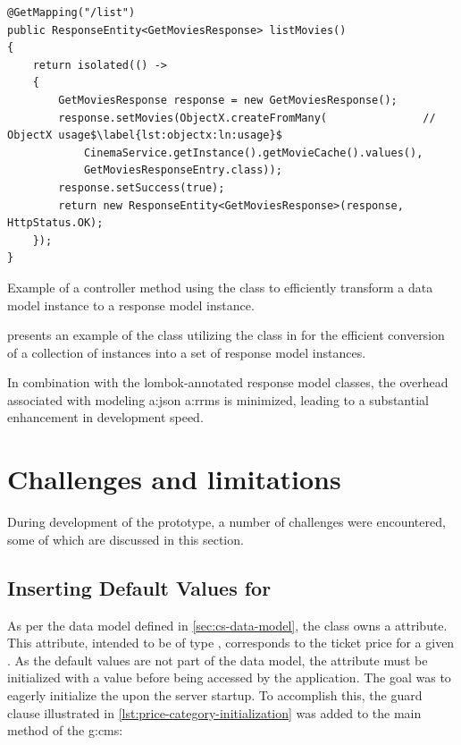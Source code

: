\begin{listing}[H]
\begin{verbatim}
@GetMapping("/list")
public ResponseEntity<GetMoviesResponse> listMovies() 
{
    return isolated(() -> 
    {
        GetMoviesResponse response = new GetMoviesResponse();
        response.setMovies(ObjectX.createFromMany(               // ObjectX usage$\label{lst:objectx:ln:usage}$
            CinemaService.getInstance().getMovieCache().values(), 
            GetMoviesResponseEntry.class));
        response.setSuccess(true);
        return new ResponseEntity<GetMoviesResponse>(response, HttpStatus.OK);
    });
}
\end{verbatim}
\vspace{-.5cm}
\caption{Example of a controller method using the  class to efficiently transform a data model instance to a response model instance.}
\label{lst:reflective-object-mapping-example}
\end{listing}

 presents an example of the  class utilizing the  class in  for the efficient conversion of a collection of  instances into a set of  response model instances.

In combination with the lombok-annotated response model classes, the overhead associated with modeling \gls{a:json} \glspl{a:rrm} is minimized, leading to a substantial enhancement in development speed.

\section{Challenges and limitations}\label{sec:impl-challenges}

During development of the prototype, a number of challenges were encountered, some of which are discussed in this section.

\subsection{Inserting Default Values for }

As per the data model defined in \cref{sec:cs-data-model}, the  class owns a  attribute. This attribute, intended to be of type , corresponds to the ticket price for a given . As the default values are not part of the data model, the  attribute must be initialized with a value before being accessed by the application. The goal was to eagerly initialize the  upon the server startup. To accomplish this, the guard clause illustrated in \cref{lst:price-category-initialization} was added to the main method of the \gls{g:cms}:

